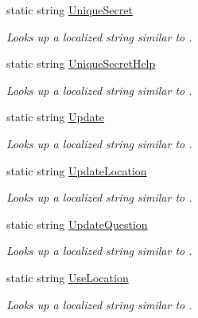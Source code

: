 \begin{DoxyCompactItemize}
static string \hyperlink{class_wis_r_1_1_app___resources_1_1_resource_a393a8cafe1ef1729c07819950f906bab}{Unique\+Secret}
\begin{DoxyCompactList}\small\item\em Looks up a localized string similar to . \end{DoxyCompactList}\item 
static string \hyperlink{class_wis_r_1_1_app___resources_1_1_resource_ac4ce447a1d6913ed38afb8d4b381638e}{Unique\+Secret\+Help}
\begin{DoxyCompactList}\small\item\em Looks up a localized string similar to . \end{DoxyCompactList}\item 
static string \hyperlink{class_wis_r_1_1_app___resources_1_1_resource_ab20023c08ca1b673632d8b41a6c037bf}{Update}
\begin{DoxyCompactList}\small\item\em Looks up a localized string similar to . \end{DoxyCompactList}\item 
static string \hyperlink{class_wis_r_1_1_app___resources_1_1_resource_a35d7cbe89630bfad2fa08e5d0b87e3de}{Update\+Location}
\begin{DoxyCompactList}\small\item\em Looks up a localized string similar to . \end{DoxyCompactList}\item 
static string \hyperlink{class_wis_r_1_1_app___resources_1_1_resource_ab7293685754c9220bf3d8bc4809c57e0}{Update\+Question}
\begin{DoxyCompactList}\small\item\em Looks up a localized string similar to . \end{DoxyCompactList}\item 
static string \hyperlink{class_wis_r_1_1_app___resources_1_1_resource_a2b3d86803393d80bdfa3f6f0a3f5655d}{Use\+Location}
\begin{DoxyCompactList}\small\item\em Looks up a localized string similar to . \end{DoxyCompactList}\item 

\end{DoxyCompactItemize}
